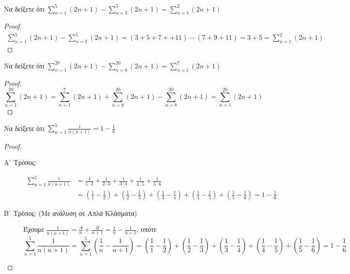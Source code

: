 \documentclass[main.tex]{subfiles}
\begin{document}
\begin{example}
  Να δείξετε ότι $ \sum_{n=1}^{5} (2n+1) - \sum_{n=3}^{5} (2n+1)  =  
  \sum_{n=1}^{2} (2n+1) $
\end{example}
\begin{proof}
  \begin{align*}
    \sum_{n=1}^{5} (2n+1)- \sum_{n=3}^{5} (2n+1) = 
    (3+5+7++11) - (7+9+11) = 3 + 5 = \sum_{n=1}^{2} (2n+1) 
  \end{align*}
\end{proof}

\begin{example}
  Να δείξετε ότι $ \sum_{n=1}^{20} (2n+1) - \sum_{n=8}^{20} (2n+1) = \sum_{n=1}^{7} 
  (2n+1) $ 
\end{example}
\begin{proof}
\item 
  \[
    \sum_{n=1}^{20} (2n+1) = \sum_{n=1}^{7} (2n+1) + 
    \sum_{n=8}^{20} (2n+1) - \sum_{n=8}^{20} (2n+1) = 
    \sum_{n=1}^{20} (2n+1)
  \]
\end{proof}

\begin{example}
  Να δείξετε ότι $ \sum_{n=1}^{5} \frac{1}{n(n+1)} = 1 - \frac{1}{6}  $
\end{example}
\begin{proof}
\item {}
  \begin{description}
    \item [Α᾽ Τρόπος:]
      \begin{align*}
        \sum_{n=1}^{5} \frac{1}{n(n+1)} 
        &= \frac{1}{1\cdot 2} + \frac{1}{2 \cdot 3} + \frac{1}{3 \cdot 4} 
        + \frac{1}{4 \cdot 5} + \frac{1}{5 \cdot 6} \\
        &= \left(\frac{1}{1} - \frac{1}{2}\right) + \left(\frac{1}{2} 
        - \frac{1}{3} \right) + \left(\frac{1}{3} - \frac{1}{4}\right) 
        + \left(\frac{1}{4} - \frac{1}{5}\right) +
        \left(\frac{1}{5} - \frac{1}{6}\right)  = 1 - \frac{1}{6}
      \end{align*}
    \item [Β᾽ Τρόπος: (Με ανάλυση σε Απλά Κλάσματα)]
      Έχουμε $ \frac{1}{n(n+1)} = \frac{A}{n} + \frac{B}{n+1} = 
      \frac{1}{n} - \frac{1}{n+1}$, οπότε
      \begin{equation*}
        \sum_{n=1}^{5} \frac{1}{n(n+1)} = \sum_{n=1}^{5} \left(\frac{1}{n} - 
        \frac{1}{n+1}\right)    
        = \left(\frac{1}{1} - \frac{1}{2}\right) + \left(\frac{1}{2} 
        - \frac{1}{3} \right) + \left(\frac{1}{3} - \frac{1}{4}\right) 
        + \left(\frac{1}{4} - \frac{1}{5}\right) +
        \left(\frac{1}{5} - \frac{1}{6}\right)  = 1 - \frac{1}{6}
      \end{equation*} 
  \end{description}
\end{proof}
\end{document}
